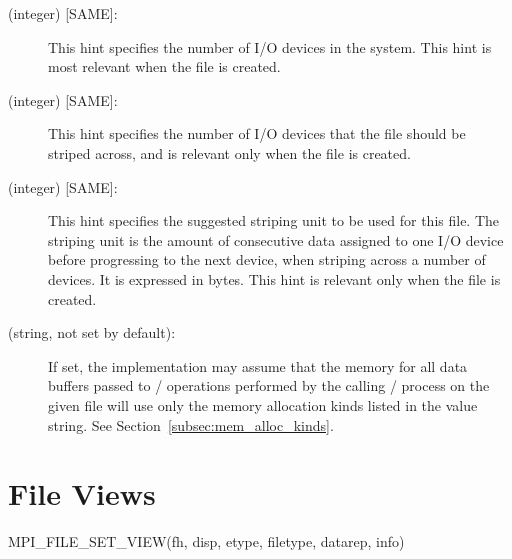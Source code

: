 \begin{description}
\item[ (integer) {[SAME]}:]
This hint specifies the number of I/O devices in the system.
This hint is most relevant when the file is created.
\item[ (integer) {[SAME]}:]
This hint specifies the number of I/O devices
that the file should be striped across, and is
relevant only when the file is created.

\item[ (integer) {[SAME]}:]
This hint specifies the suggested striping unit to be used for this file.
The striping unit is the amount
of consecutive data assigned to one I/O device
before progressing to the next device,
when striping across a number of devices.
It is expressed in bytes.
This hint is relevant only when the file is created.

\item[ (string, not set by default):]
If set, the implementation may assume that the memory for all
data buffers passed to \MPI/ operations performed by the calling \MPI/
process on the given file will use only the memory allocation kinds
listed in the value string.
See Section~\ref{subsec:mem_alloc_kinds}.

\end{description}

\section{File Views}
\label{sec:io-view}

%
%
%
\begin{funcdef}{MPI\_FILE\_SET\_VIEW}{(\mbox{fh}, \mbox{disp}, \mbox{etype}, \mbox{filetype}, \mbox{datarep}, \mbox{info})}
\end{funcdef}

